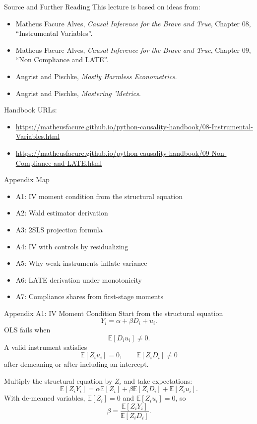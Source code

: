 \documentclass[11pt,aspectratio=169]{beamer}
\newcommand{\E}{\mathbb{E}}
\newcommand{\backbutton}[1]{\vspace{0.4em}\hfill\hyperlink{main:#1}{\beamerbutton{Back to main slide}}}
\begin{document}
\begin{frame}{Source and Further Reading}
  This lecture is based on ideas from:
  \begin{itemize}
    \item Matheus Facure Alves, \emph{Causal Inference for the Brave and True}, Chapter 08, ``Instrumental Variables''.
    \item Matheus Facure Alves, \emph{Causal Inference for the Brave and True}, Chapter 09, ``Non Compliance and LATE''.
    \item Angrist and Pischke, \emph{Mostly Harmless Econometrics}.
    \item Angrist and Pischke, \emph{Mastering 'Metrics}.
  \end{itemize}

  \vspace{0.3em}
  Handbook URLs:
  \begin{itemize}
    \item \url{https://matheusfacure.github.io/python-causality-handbook/08-Instrumental-Variables.html}
    \item \url{https://matheusfacure.github.io/python-causality-handbook/09-Non-Compliance-and-LATE.html}
  \end{itemize}
\end{frame}

\appendix

\begin{frame}{Appendix Map}
  \begin{itemize}
    \item A1: IV moment condition from the structural equation
    \item A2: Wald estimator derivation
    \item A3: 2SLS projection formula
    \item A4: IV with controls by residualizing
    \item A5: Why weak instruments inflate variance
    \item A6: LATE derivation under monotonicity
    \item A7: Compliance shares from first-stage moments
  \end{itemize}
\end{frame}

\begin{frame}{Appendix A1: IV Moment Condition}
  \hypertarget{app:iv-moment}{}
  \small
  Start from the structural equation
  \[
    Y_i = \alpha + \beta D_i + u_i.
  \]
  OLS fails when
  \[
    \E[D_i u_i]\neq 0.
  \]
  A valid instrument satisfies
  \[
    \E[Z_i u_i]=0,
    \qquad
    \E[Z_iD_i]\neq 0
  \]
  after demeaning or after including an intercept.

  Multiply the structural equation by \(Z_i\) and take expectations:
  \[
    \E[Z_iY_i]=\alpha\E[Z_i]+\beta\E[Z_iD_i]+\E[Z_iu_i].
  \]
  With de-meaned variables, \(\E[Z_i]=0\) and \(\E[Z_iu_i]=0\), so
  \[
    \beta=\frac{\E[Z_iY_i]}{\E[Z_iD_i]}.
  \]
  \backbutton{iv-conditions}
\end{frame}
\end{document}
